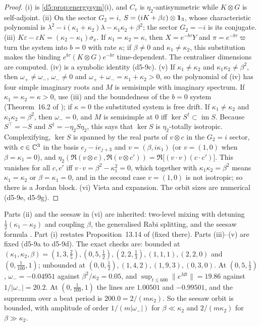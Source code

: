 \begin{proof}
(i) is \cref{d5:prop:energysym}(i), and $C_v$ is $\eta_2$-antisymmetric while $K\otimes G$ is self-adjoint. (ii) On the sector $G_2=i$,
$S=(iK+\beta\varepsilon)\otimes\mathbf 1_3$, whose characteristic polynomial is $\lambda^2-i(\kappa_1+\kappa_2)\lambda-\kappa_1\kappa_2+\beta^2$; the sector $G_2=-i$ is
its conjugate. (iii) $K\varepsilon-\varepsilon K=(\kappa_2-\kappa_1)\sigma_x$. If $\kappa_1=\kappa_2=\kappa$, then $X=e^{-b\tau}Y$ and $\pi=e^{-b\tau}\varpi$ turn
the system into $b=0$ with rate $\kappa$; if $\beta\neq0$ and $\kappa_1\neq\kappa_2$, this substitution makes the binding $e^{b\tau}(K\otimes G)e^{-b\tau}$ time-dependent. The
centraliser dimensions are computed. (iv) is a symbolic identity (d5-9c). (v) If $\kappa_1\neq\kappa_2$ and $\kappa_1\kappa_2\neq\beta^2$, then $\omega_+\neq\omega_-$,
$\omega_-\neq0$ and $\omega_++\omega_-=\kappa_1+\kappa_2>0$, so the polynomial of (iv) has four simple imaginary roots and $M$ is semisimple with imaginary
spectrum. If $\kappa_1=\kappa_2=\kappa>0$, use (iii) and the boundedness of the $b=0$ system (Theorem~16.2 of \cite{ES17}); if $\kappa=0$ the substituted
system is free drift. If $\kappa_1\neq\kappa_2$ and $\kappa_1\kappa_2=\beta^2$, then $\omega_-=0$, and $M$ is semisimple at $0$ iff $\ker S^\dagger\subset\operatorname{im}S$.
Because $S^{\!\top}=-S$ and $S^\dagger=-\eta_2S\eta_2$, this says that $\ker S$ is $\eta_2$-totally isotropic. Complexifying, $\ker S$ is spanned by
the real parts of $v\otimes c$ in the $G_2=i$ sector, with $c\in\mathbb{C}^3$ in the basis $e_j-ie_{j+3}$ and $v=(\beta,i\kappa_1)$ (or $v=(1,0)$ when $\beta=\kappa_1=0$), and
$\eta_2(\Re(v\otimes c),\Re(v\otimes c'))=\Re\bigl[(v\cdot v)(c\cdot c')\bigr]$. This vanishes for all $c,c'$ iff $v\cdot v=\beta^2-\kappa_1^2=0$, which together
with $\kappa_1\kappa_2=\beta^2$ means $\kappa_1=\kappa_2$ or $\beta=\kappa_1=0$, and in the second case $v=(1,0)$ is not isotropic; so there is a Jordan block.
(vi) Vieta and expansion. The orbit sizes are numerical (d5-9e, d5-9g).
\end{proof}

Parts (ii) and the seesaw in (vi) are inherited: two-level mixing with detuning $\tfrac12(\kappa_1-\kappa_2)$ and coupling $\beta$, the generalised Rabi
splitting, and the seesaw formula \cite{Minkowski77}. Part (i) restates Proposition~13.14 of \cite{ES17} (fixed there). Parts (iii)--(v) are fixed
(d5-9a to d5-9d). The exact checks are: bounded at $(\kappa_1,\kappa_2,\beta)=(1,3,\tfrac25),(0,5,\tfrac12),(2,2,\tfrac13),(1,1,1),(2,2,0)$ and
$(0,\tfrac1{100},1)$; unbounded at $(0,0,\tfrac12),(1,4,2),(1,9,3),(0,3,0)$. At $(0,5,\tfrac12)$, $\omega_-=-0.04951$ against $\beta^2/\kappa_2=0.05$, and
$\sup_{t\le600}\|e^{Mt}\|=19.86$ against $1/|\omega_-|=20.2$. At $(0,\tfrac1{100},1)$ the lines are $1.00501$ and $-0.99501$, and the supremum over a beat
period is $200.0=2/(m\kappa_2)$. So the seesaw orbit is bounded, with amplitude of order $1/(m|\omega_-|)$ for $\beta\ll\kappa_2$ and $2/(m\kappa_2)$ for
$\beta\gg\kappa_2$.

